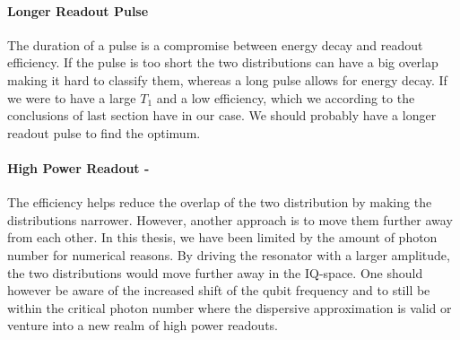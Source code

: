 \paragraph{Longer Readout Pulse} The duration of a pulse is a compromise between energy decay and readout efficiency. If the pulse is too short the two distributions can have a big overlap making it hard to classify them, whereas a long pulse allows for energy decay. If we were to have a large $T_1$ and a low efficiency, which we according to the conclusions of last section have in our case. We should probably have a longer readout pulse to find the optimum. 

\paragraph{High Power Readout - } The efficiency helps reduce the overlap of the two distribution by making the distributions narrower. However, another approach is to move them further away from each other. In this thesis, we have been limited by the amount of photon number for numerical reasons. By driving the resonator with a larger amplitude, the two distributions would move further away in the IQ-space. One should however be aware of the increased shift of the qubit frequency and to still be within the critical photon number where the dispersive approximation is valid or venture into a new realm of high power readouts. 


